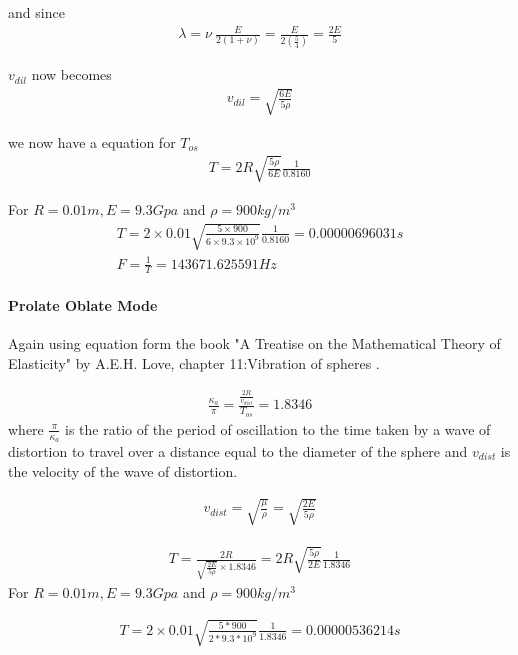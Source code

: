 and since
\begin{align}
\lambda = \nu \ \frac{E}{2(1+\nu)} = \frac{E}{2(\frac{5}{4})} = \frac{2E}{5}
\end{align}

$v_{dil}$ now becomes
\begin{align}
v_{dil} = \sqrt{\frac{6E}{5\rho}}
\end{align}

we now have a equation for $T_{os}$
\begin{align}
T = 2R \sqrt{\frac{5\rho}{6E}} \frac{1}{0.8160}
\end{align}

For $R=0.01m, E=9.3Gpa$ and $\rho=900kg/m^{3}$
\begin{align}
T = 2\times 0.01 \sqrt{\frac{5 \times 900}{6 \times 9.3\times 10^{9}}} \frac{1}{0.8160} = 0.00000696031s \\
F = \frac{1}{T} = 143671.625591 Hz
\end{align} 


\paragraph{Prolate Oblate Mode}
Again using equation form the book "A Treatise on the Mathematical Theory of Elasticity" by A.E.H. Love, chapter 11:Vibration of spheres \citep{aelove}.

\begin{align}
\frac{\kappa_{a}}{\pi} = \frac{\frac{2R}{v_{dist}}}{T_{os}} = 1.8346
\end{align}
where $\frac{\pi}{\kappa_{a}}$ is the ratio of the period of oscillation to the time taken by a wave of distortion to travel over a distance equal to the diameter of the sphere and $v_{dist}$ is the velocity of the wave of distortion.

\begin{align}
v_{dist} = \sqrt{\frac{\mu}{\rho}} = \sqrt{\frac{2E}{5\rho}}
\end{align}

\begin{align}
T = \frac{2R}{\sqrt{\frac{2E}{5\rho}}\times 1.8346}
= 2R \sqrt{\frac{5\rho}{2E}} \frac{1}{1.8346}
\end{align}
For $R=0.01m, E=9.3Gpa$ and $\rho=900kg/m^{3}$

\begin{align}
T = 2\times 0.01 \sqrt{\frac{5*900}{2*9.3*10^9}} \frac{1}{1.8346} = 0.00000536214s
\end{align} 


